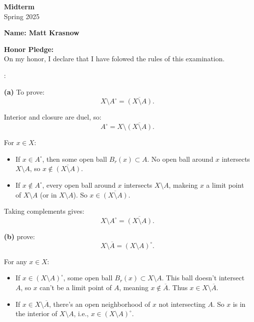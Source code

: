 \documentclass[12pt,oneside]{article}
\theoremstyle{definition}
\begin{document}
\begin{center}
  \textbf{\Large Midterm}\\[0.5em]
  \large Spring 2025
\end{center}

\vspace{2em}

\noindent \textbf{Name: Matt Krasnow} 

\vspace{2em}

\noindent \textbf{Honor Pledge:}\\[0.5em]
On my honor, I declare that I have folowed the rules of this examination.

\vfill

\newpage

\begin{solution}
:

\textbf{(a)} To prove:
\[
X\setminus A^\circ = \overline{(X\setminus A)}.
\]

Interior and closure are duel, so:
\[
A^\circ = X\setminus \overline{(X\setminus A)}.
\]

For \(x\in X\):
\begin{itemize}
    \item If \(x\in A^\circ\), then some open ball \(B_r(x)\subset A\). No open ball around \(x\) intersects \(X\setminus A\), so \(x\notin \overline{(X\setminus A)}\).
    \item If \(x\notin A^\circ\), every open ball around \(x\) intersects \(X\setminus A\), makeing \(x\) a limit point of \(X\setminus A\) (or in \(X\setminus A\)). So \(x\in \overline{(X\setminus A)}\).
\end{itemize}

Taking complements gives:
\[
X\setminus A^\circ = \overline{(X\setminus A)}.
\]







\textbf{(b)} prove:
\[
X\setminus \overline{A} = (X\setminus A)^\circ.
\]

For any \(x\in X\):
\begin{itemize}
    \item If \(x\in (X\setminus A)^\circ\), some open ball \(B_r(x)\subset X\setminus A\). This ball doesn't intersect \(A\), so \(x\) can't be a limit point of \(A\), meaning \(x\notin \overline{A}\). Thus \(x\in X\setminus \overline{A}\).
    \item If \(x\in X\setminus \overline{A}\), there's an open neighborhood of \(x\) not intersecting \(A\). So \(x\) is in the interior of \(X\setminus A\), i.e., \(x\in (X\setminus A)^\circ\).
\end{itemize}


\end{solution}
\end{document}
